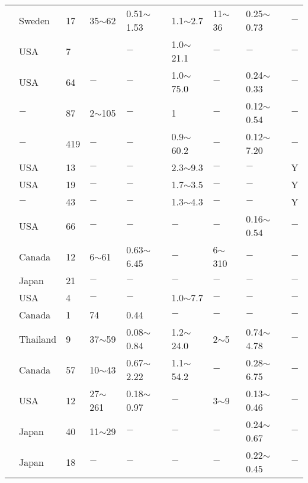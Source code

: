 {\begin{longtable}{lllllllll}
    \citet{Massarsch19761041} & Sweden & 17    & 35$\sim$62 & 0.51$\sim$1.53 & 1.1$\sim$2.7 & 11$\sim$36 & 0.25$\sim$0.73 & $-$ \\
    \citet{Mayne19801219} & USA   & 7     &       & $-$     & 1.0$\sim$21.1 & $-$     & $-$     & $-$ \\
    \citet{Mayne1985356} & USA   & 64    & $-$     & $-$     & 1.0$\sim$75.0 & $-$     & 0.24$\sim$0.33 & $-$ \\
    \citet{Mayne198564} & $-$     & 87    & 2$\sim$105 & $-$     & 1     & $-$     & 0.12$\sim$0.54 & $-$ \\
    \citet{Mayne198876} & $-$     & 419   & $-$     & $-$     & 0.9$\sim$60.2 & $-$     & 0.12$\sim$7.20 & $-$ \\
    \citet{Mayne19891} & USA   & 13    & $-$     & $-$     & 2.3$\sim$9.3 & $-$     & $-$     & Y \\
    \citet{Mayne199165} & USA   & 19    & $-$     & $-$     & 1.7$\sim$3.5 & $-$     & $-$     & Y \\
    \citet{Mayne2008151} & $-$     & 43    & $-$     & $-$     & 1.3$\sim$4.3 & $-$     & $-$     & Y \\
    \citet{Mayne1985579} & USA   & 66    & $-$     & $-$     & $-$     & $-$     & 0.16$\sim$0.54 & $-$ \\
    \citet{Mitchell19721051} & Canada & 12    & 6$\sim$61  & 0.63$\sim$6.45 & $-$     & 6$\sim$310 & $-$     & $-$ \\
    \citet{Mitachi197645} & Japan & 21    & $-$     & $-$     & $-$     & $-$     & $-$     & $-$ \\
    \citet{Mitchell1956693} & USA   & 4     & $-$     & $-$     & 1.0$\sim$7.7 & $-$     & $-$     & $-$ \\
    \citet{Mishtak1964133} & Canada & 1     & 74    & 0.44  & $-$     & $-$     & $-$     & $-$ \\
    \citet{Moh1969287} & Thailand & 9     & 37$\sim$59 & 0.08$\sim$0.84 & 1.2$\sim$24.0 & 2$\sim$5   & 0.74$\sim$4.78 & $-$ \\
    \citet{Morin1983782} & Canada & 57    & 10$\sim$43 & 0.67$\sim$2.22 & 1.1$\sim$54.2 & $-$     & 0.28$\sim$6.75 & $-$ \\
    \citet{Moum1961263} & USA   & 12    & 27$\sim$261 & 0.18$\sim$0.97 & $-$     & 3$\sim$9   & 0.13$\sim$0.46 & $-$ \\
    \citet{Nakase198391} & Japan & 40    & 11$\sim$29 & $-$     & $-$     & $-$     & 0.24$\sim$0.67 & $-$ \\
    \citet{Nakase198685} & Japan & 18    & $-$     & $-$     & $-$     & $-$     & 0.22$\sim$0.45 & $-$ \\

\end{longtable}}
